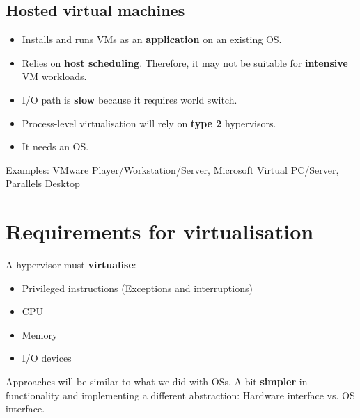 \documentclass{article}
\begin{document}
\subsection{Hosted virtual machines}
\begin{flushleft}
\begin{itemize}
	\item Installs and runs VMs as an \textbf{application} on an existing OS.
	\item Relies on \textbf{host scheduling}. Therefore, it may not be suitable for \textbf{intensive} VM workloads.
	\item I/O path is \textbf{slow} because it requires world switch.
	\item Process-level virtualisation will rely on \textbf{type 2} hypervisors.
	\item It needs an OS.
\end{itemize}
Examples: VMware Player/Workstation/Server, Microsoft Virtual PC/Server, Parallels Desktop
\end{flushleft}

\section{Requirements for virtualisation}
\begin{flushleft}
A hypervisor must \textbf{virtualise}:
\begin{itemize}
	\item Privileged instructions (Exceptions and interruptions)
	\item CPU
	\item Memory
	\item I/O devices
\end{itemize}
Approaches will be similar to what we did with OSs. A bit \textbf{simpler} in functionality and implementing a different abstraction: Hardware interface vs. OS interface.
\end{flushleft}
\end{document}
